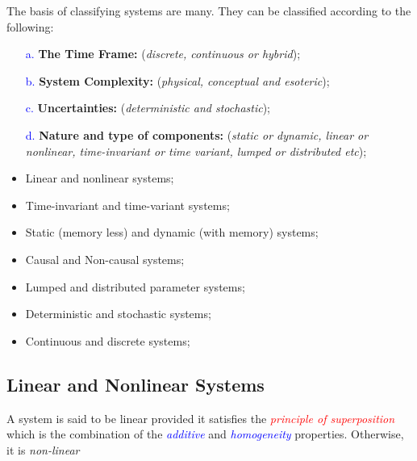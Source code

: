 \documentclass[
  12pt,
  a4paper,
]{report}
\begin{document}
The basis of classifying systems are many. They can be classified according to the following:\\
\begin{tcolorbox}[colback=boxbodycol,colframe=boxheadcol,title=\textcolor{red}{\textbf{Types of System Classifications}}]
\label{fig:system-type-list-tc}
    \begin{itemize}
        \item[\textcolor{blue}{a.}] \textbf{The Time Frame:} (\emph{discrete, continuous or hybrid});
        \item[\textcolor{blue}{b.}] \textbf{System Complexity:} (\emph{physical, conceptual and esoteric});
        \item[\textcolor{blue}{c.}] \textbf{Uncertainties:} (\emph{deterministic and stochastic});
        \item[\textcolor{blue}{d.}] \textbf{Nature and type of components:} (\emph{static or dynamic, linear or nonlinear, time-invariant or time variant, lumped or distributed etc});
    \end{itemize}
    \begin{itemize}
        \item Linear and nonlinear systems;
        \item Time-invariant and time-variant systems;
        \item Static (memory less) and dynamic (with memory) systems;
        \item Causal and Non-causal systems;
        \item Lumped and distributed parameter systems;
        \item Deterministic and stochastic systems;
        \item Continuous and discrete systems;
    \end{itemize}
\end{tcolorbox}
\newpage

\subsection{Linear and Nonlinear
Systems}\label{linear-and-nonlinear-systems}

\begin{tcolorbox}[colback=boxbodycol,colframe=boxheadcol,title=\textcolor{red}{\textbf{Linear and Nonlinear Systems}}]
    \begin{center}
        A system is said to be linear provided it satisfies the \textcolor{red}{\emph{principle of superposition}} which is the combination of the \textcolor{blue}{\emph{additive}} and \textcolor{blue}{\emph{homogeneity}} properties. Otherwise, it is \emph{non-linear}
    \end{center}
\end{tcolorbox}\label{fig:linear-nonlinear-system-def-md}
\end{document}

